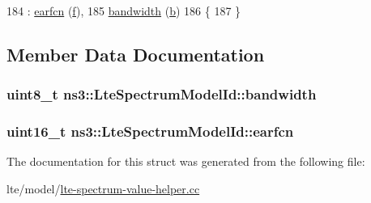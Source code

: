 \begin{DoxyCode}
184   : \hyperlink{structns3_1_1LteSpectrumModelId_a9838ebe37e03ce6104eb056dfb9e3768}{earfcn} (\hyperlink{buildings__pathloss_8m_aa52d3a6e3de5a80a97c12364caeaa125}{f}), 
185     \hyperlink{structns3_1_1LteSpectrumModelId_ad13b81d57ca1b80a69bf97bd10a18fbb}{bandwidth} (\hyperlink{buildings__pathloss_8m_a21ad0bd836b90d08f4cf640b4c298e7c}{b})
186 \{
187 \}
\end{DoxyCode}


\subsection{Member Data Documentation}
\subsubsection[{\texorpdfstring{bandwidth}{bandwidth}}]{\setlength{\rightskip}{0pt plus 5cm}uint8\+\_\+t ns3\+::\+Lte\+Spectrum\+Model\+Id\+::bandwidth}\hypertarget{structns3_1_1LteSpectrumModelId_ad13b81d57ca1b80a69bf97bd10a18fbb}{}\label{structns3_1_1LteSpectrumModelId_ad13b81d57ca1b80a69bf97bd10a18fbb}
\subsubsection[{\texorpdfstring{earfcn}{earfcn}}]{\setlength{\rightskip}{0pt plus 5cm}uint16\+\_\+t ns3\+::\+Lte\+Spectrum\+Model\+Id\+::earfcn}\hypertarget{structns3_1_1LteSpectrumModelId_a9838ebe37e03ce6104eb056dfb9e3768}{}\label{structns3_1_1LteSpectrumModelId_a9838ebe37e03ce6104eb056dfb9e3768}


The documentation for this struct was generated from the following file\+:\begin{DoxyCompactItemize}
\item 
lte/model/\hyperlink{lte-spectrum-value-helper_8cc}{lte-\/spectrum-\/value-\/helper.\+cc}\end{DoxyCompactItemize}
